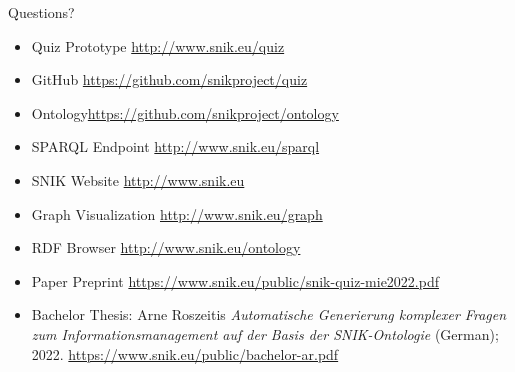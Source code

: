 \documentclass[aspectratio=1610,12pt]{beamer}
\begin{document}
\begin{frame}[fragile]{Questions?}
\begin{itemize}
\vspace{0.5em}%
\item Quiz Prototype \url{http://www.snik.eu/quiz}
\item GitHub \url{https://github.com/snikproject/quiz}
\item Ontology\url{https://github.com/snikproject/ontology}
\item SPARQL Endpoint \url{http://www.snik.eu/sparql}
\item SNIK Website \url{http://www.snik.eu}
\item Graph Visualization \url{http://www.snik.eu/graph}
\item RDF Browser \url{http://www.snik.eu/ontology}
\item Paper Preprint \url{https://www.snik.eu/public/snik-quiz-mie2022.pdf}
\item Bachelor Thesis: Arne Roszeitis \emph{Automatische Generierung komplexer Fragen zum Informationsmanagement auf der Basis der SNIK-Ontologie} (German); 2022. \url{https://www.snik.eu/public/bachelor-ar.pdf}
\end{itemize}
\end{frame}
\end{document}
